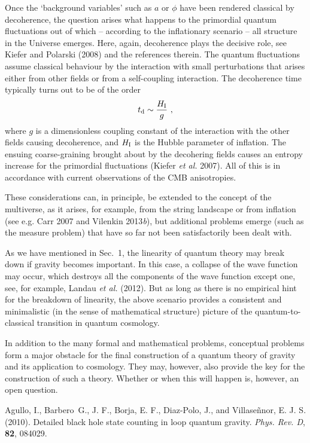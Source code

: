 \documentclass[12pt,a4paper]{article}
\newcommand{\be}{\begin{equation}}
\newcommand{\ee}{\end{equation}}
\begin{document}
Once the `background variables' such as $a$ or $\phi$ have been
rendered classical by decoherence, the question arises what happens to
the primordial quantum fluctuations out of which -- according to the
inflationary scenario -- all structure in the Universe emerges. 
Here, again, decoherence plays the decisive role, see Kiefer and
Polarski (2008) and the references therein. The quantum fluctuations
assume classical behaviour by the interaction with small perturbations
that arises either from other fields or from a self-coupling interaction.
The decoherence time typically turns out to be of the order
\be
t_{\rm d}\sim \frac{H_{\rm I}}{g}\ ,
\ee
where $g$ is a dimensionless coupling constant of the interaction
with the other fields causing decoherence, and $H_{\rm I}$ is the
Hubble parameter of inflation. The ensuing
coarse-graining brought about by the decohering fields causes an
entropy increase for the primordial fluctuations (Kiefer {\em et al.}
2007). All of this is in accordance with current observations of the CMB
anisotropies. 

These considerations can, in principle, be extended to the concept
of the multiverse, as it arises, for example, from the string
landscape or from inflation (see e.g. Carr 2007 and
Vilenkin 2013{\em b}), but additional problems emerge 
(such as the measure problem) that have
so far not been satisfactorily been dealt with.

As we have mentioned in Sec.~1, the linearity of quantum theory may
break down if gravity becomes important. In this case, a
collapse of the wave function may occur, which destroys all the
components of the 
wave function except one, see, for example, Landau {\em et al.} (2012).
But as long as there is no empirical
hint for the breakdown of linearity, the above scenario provides a
consistent and minimalistic (in the sense of mathematical structure)
picture of the quantum-to-classical 
transition in quantum cosmology.  

In addition to the many formal and mathematical problems, conceptual
problems form 
a major obstacle for the final construction of a quantum theory of
gravity and its application to cosmology. They may, however, also
provide the key 
for the construction of such a theory. Whether or when this will
happen is, however, an open question. 



\bibitem{} Agullo, I., Barbero~G., J. F., Borja, E. F., Diaz-Polo, J.,
and Villase\~{n}nor, E. J. S. (2010). 
Detailed black hole state counting in loop quantum gravity.
{\em Phys. Rev. D}, {\bf 82}, 084029. 
\end{document}
